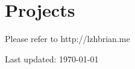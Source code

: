 \documentclass[11pt, a4paper]{article} %
\begin{document}
\section*{Projects}
Please refer to http://lzhbrian.me








\vfill{} %


\begin{center}
{\scriptsize Last updated: \today}
\end{center}

\end{document}
